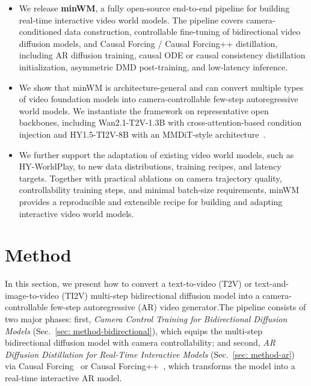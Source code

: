 \documentclass{llmxive}
\begin{document}
\begin{itemize}
    \item We release \textbf{minWM}, a fully open-source end-to-end pipeline for building real-time interactive video world models. The pipeline covers camera-conditioned data construction, controllable fine-tuning of bidirectional video diffusion models, and Causal Forcing / Causal Forcing++ distillation, including AR diffusion training, causal ODE or causal consistency distillation initialization, asymmetric DMD post-training, and low-latency inference. 

    \item We show that minWM is architecture-general and can convert multiple types of video foundation models into camera-controllable few-step autoregressive world models. We instantiate the framework on representative open backbones, including Wan2.1-T2V-1.3B with cross-attention-based condition injection and HY1.5-TI2V-8B with an MMDiT-style architecture~\cite{esser2024scaling}.

    \item We further support the adaptation of existing video world models, such as HY-WorldPlay, to new data distributions, training recipes, and latency targets. Together with practical ablations on camera trajectory quality, controllability training steps, and minimal batch-size requirements, minWM provides a reproducible and extensible recipe for building and adapting interactive video world models.
\end{itemize}

\section{Method}
\label{sec: method}
In this section, we present how to convert a text-to-video (T2V) or text-and-image-to-video (TI2V) multi-step bidirectional diffusion model into a camera-controllable few-step autoregressive (AR) video generator.The pipeline consists of two major phases: first, \emph{Camera Control Training for Bidirectional Diffusion Models} (Sec.~\ref{sec: method-bidirectional}), which equips the multi-step bidirectional diffusion model with camera controllability; and second, \emph{AR Diffusion Distillation for Real-Time Interactive Models} (Sec.~\ref{sec: method-ar}) via Causal Forcing~\cite{zhu2026causal} or Causal Forcing++~\cite{zhao2026causal}, which transforms the model into a real-time interactive AR model.
\end{document}
